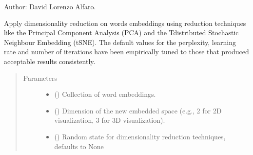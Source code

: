 \documentclass[letterpaper,10pt,english]{sphinxmanual}
\begin{document}
Author: David Lorenzo Alfaro.

\begin{fulllineitems}
\label{\detokenize{code:code_utils.plotter.apply_dimensionality_reduction}}
Apply dimensionality reduction on words embeddings using reduction
techniques like the Principal Component Analysis (PCA) and the T\sphinxhyphen{}distributed
Stochastic Neighbour Embedding (t\sphinxhyphen{}SNE).  The default values for the perplexity,
learning rate and number of iterations have been empirically tuned to
those that produced acceptable results consistently.
\begin{quote}\begin{description}
\item[{Parameters}] \leavevmode\begin{itemize}
\item {} 
 () \textendash{} Collection of word embeddings.

\item {} 
 () \textendash{} Dimension of the new embedded space (e.g., 2 for
2D visualization, 3 for 3D visualization).

\item {} 
 (\sphinxstyleliteralemphasis{\sphinxupquote{, }}) \textendash{} Random state for dimensionality reduction techniques,
defaults to None


\end{itemize}
\end{description}
\end{quote}
\end{fulllineitems}
\end{document}
